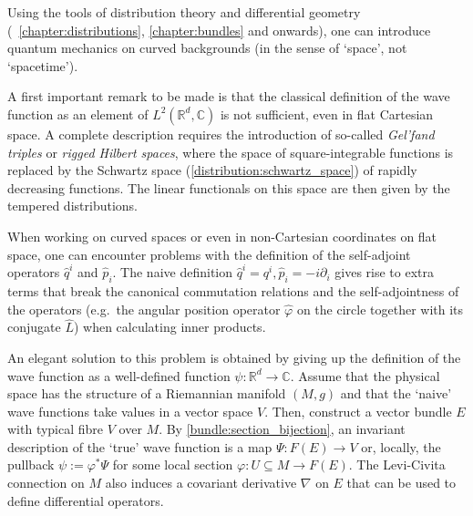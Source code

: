     Using the tools of distribution theory and differential geometry (~\ref{chapter:distributions}, \ref{chapter:bundles} and onwards), one can introduce quantum mechanics on curved backgrounds (in the sense of `space', not `spacetime').

    \begin{remark}
        A first important remark to be made is that the classical definition of the wave function as an element of $L^2(\mathbb{R}^d,\mathbb{C})$ is not sufficient, even in flat Cartesian space. A complete description requires the introduction of so-called \textit{Gel'fand triples} or \textit{rigged Hilbert spaces}, where the space of square-integrable functions is replaced by the Schwartz space (\cref{distribution:schwartz_space}) of rapidly decreasing functions. The linear functionals on this space are then given by the tempered distributions.
    \end{remark}

    When working on curved spaces or even in non-Cartesian coordinates on flat space, one can encounter problems with the definition of the self-adjoint operators $\widehat{q}^i$ and $\widehat{p}_i$. The naive definition $\widehat{q}^i = q^i,\widehat{p}_i = -i\partial_i$ gives rise to extra terms that break the canonical commutation relations and the self-adjointness of the operators (e.g.~the angular position operator $\widehat{\varphi}$ on the circle together with its conjugate $\widehat{L}$) when calculating inner products.

    An elegant solution to this problem is obtained by giving up the definition of the wave function as a well-defined function $\psi:\mathbb{R}^d\rightarrow\mathbb{C}$. Assume that the physical space has the structure of a Riemannian manifold $(M,g)$ and that the `naive' wave functions take values in a vector space $V$. Then, construct a vector bundle $E$ with typical fibre $V$ over $M$. By \cref{bundle:section_bijection}, an invariant description of the `true' wave function is a map $\Psi:F(E)\rightarrow V$ or, locally, the pullback $\psi:=\varphi^*\Psi$ for some local section $\varphi:U\subseteq M\rightarrow F(E)$. The Levi-Civita connection on $M$ also induces a covariant derivative $\nabla$ on $E$ that can be used to define differential operators.

